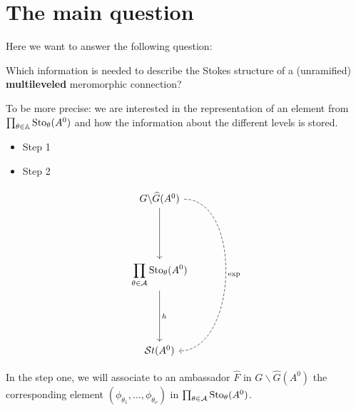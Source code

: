 \chapter{The main question}
Here we want to answer the following question:
\begin{einr}
  Which information is needed to describe the Stokes structure of a
  (unramified) \textbf{multileveled} meromorphic connection?
\end{einr}
To be more precise: we are interested in the representation of an element from
$\prod_{\theta\in\mathbb{A}}\operatorname{Sto}_\theta(A^0)$ and how the information about the
different levels is stored.

\begin{comment}
  Ideas:
  \begin{enumerate}
    \item see algorithm~\cite[II.3.4]{Loday1994}
    \item search in \cite{Loday2014}
    \item generalize the ideas from \cite{boalch,thboalch}.
  \end{enumerate}
\end{comment}

\bgroup
{}
\begin{paracol}{2}\sloppy
\switchcolumn[0]\noindent
  \vspace*{17mm}
  \begin{itemize}
    \item[] Step 1 
    \item[] Step 2 
  \end{itemize}
\switchcolumn[1]\noindent
  \[ \begin{tikzcd}[column sep=0,row sep=1.8cm]
      G\backslash\hat G(A^0)\dar{\tikzmark{e0}}
      \arrow[dd,dashed, out=0,in=0,"\exp"]
    \\\displaystyle \prod_{\theta\in\cA}\Sto_\theta(A^0)
      \dar{\tikzmark{e1}h}
    \\\St(A^0)
  \end{tikzcd} \]
\end{paracol}
\egroup
In the step one, we will associate to an ambassador $\hat F$ in
$G\backslash\hat G(A^0)$ the corresponding element
$(\phi_{\theta_1},\dots,\phi_{\theta_\nu})$ in
$\prod_{\theta\in\mathcal{A}}\operatorname{Sto}_\theta(A^0)$. 

